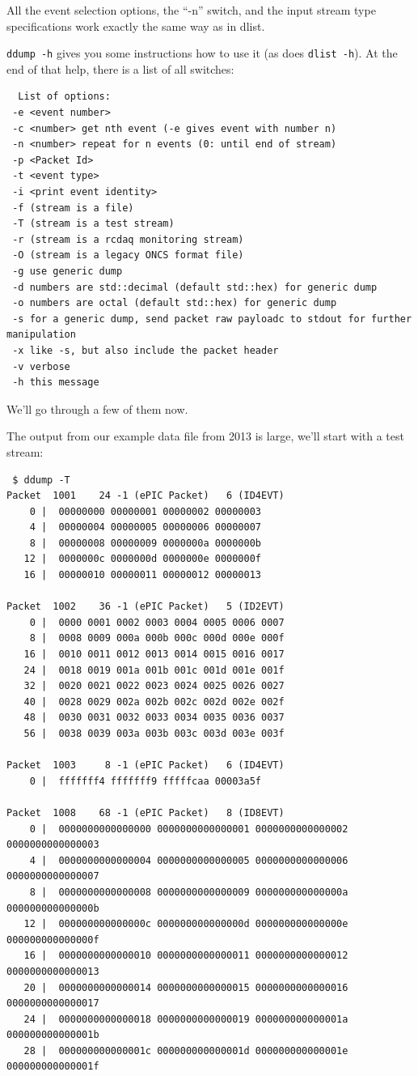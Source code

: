 \documentclass{article}[11pt]
\begin{document}
All the event selection options, the ``-n'' switch, and the input
stream type specifications work exactly the same way as in dlist.

\verb|ddump -h| gives you some instructions how to use it (as does
\verb|dlist -h|). At the end of that help, there is a list of all switches:

\begin{verbatim}
  List of options:
 -e <event number>
 -c <number> get nth event (-e gives event with number n)
 -n <number> repeat for n events (0: until end of stream)
 -p <Packet Id>
 -t <event type>
 -i <print event identity>
 -f (stream is a file)
 -T (stream is a test stream)
 -r (stream is a rcdaq monitoring stream)
 -O (stream is a legacy ONCS format file)
 -g use generic dump
 -d numbers are std::decimal (default std::hex) for generic dump
 -o numbers are octal (default std::hex) for generic dump
 -s for a generic dump, send packet raw payloadc to stdout for further manipulation
 -x like -s, but also include the packet header
 -v verbose
 -h this message
\end{verbatim}

We'll go through a few of them now.


The output from our example data file from 2013 is large, we'll
start with a test stream:

\begin{verbatim}
 $ ddump -T
Packet  1001    24 -1 (ePIC Packet)   6 (ID4EVT)
    0 |  00000000 00000001 00000002 00000003
    4 |  00000004 00000005 00000006 00000007
    8 |  00000008 00000009 0000000a 0000000b
   12 |  0000000c 0000000d 0000000e 0000000f
   16 |  00000010 00000011 00000012 00000013

Packet  1002    36 -1 (ePIC Packet)   5 (ID2EVT)
    0 |  0000 0001 0002 0003 0004 0005 0006 0007
    8 |  0008 0009 000a 000b 000c 000d 000e 000f
   16 |  0010 0011 0012 0013 0014 0015 0016 0017
   24 |  0018 0019 001a 001b 001c 001d 001e 001f
   32 |  0020 0021 0022 0023 0024 0025 0026 0027
   40 |  0028 0029 002a 002b 002c 002d 002e 002f
   48 |  0030 0031 0032 0033 0034 0035 0036 0037
   56 |  0038 0039 003a 003b 003c 003d 003e 003f

Packet  1003     8 -1 (ePIC Packet)   6 (ID4EVT)
    0 |  fffffff4 fffffff9 fffffcaa 00003a5f

Packet  1008    68 -1 (ePIC Packet)   8 (ID8EVT)
    0 |  0000000000000000 0000000000000001 0000000000000002 0000000000000003
    4 |  0000000000000004 0000000000000005 0000000000000006 0000000000000007
    8 |  0000000000000008 0000000000000009 000000000000000a 000000000000000b
   12 |  000000000000000c 000000000000000d 000000000000000e 000000000000000f
   16 |  0000000000000010 0000000000000011 0000000000000012 0000000000000013
   20 |  0000000000000014 0000000000000015 0000000000000016 0000000000000017
   24 |  0000000000000018 0000000000000019 000000000000001a 000000000000001b
   28 |  000000000000001c 000000000000001d 000000000000001e 000000000000001f

\end{verbatim}
\end{document}
